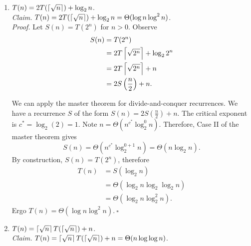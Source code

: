 \begin{enumerate}
\item$T(n)=2T(\left\lceil\sqrt{n}\right\rceil)+\log_2 n$.\\

\textit{Claim. }$T(n)=2T(\left\lceil\sqrt{n}\right\rceil)+\log_2n=\Theta(\log n\log^2 n)$.\\

\textit{Proof. }Let $S(n)=T(2^n)$ for $n>0$. Observe
\begin{align*}
S(n)&=T(2^n)\\
&=2T\left\lceil\sqrt{2^n}\right\rceil+\log_2{2^n}\\
&=2T\left\lceil\sqrt{2^n}\right\rceil+n\\
&=2S\left(\frac{n}{2}\right)+n.
\end{align*}

We can apply the master theorem for divide-and-conquer recurrences. We have a recurrence $S$ of the form $S(n)=2S\left(\frac{n}{2}\right)+n$. The critical exponent is $c^*=\log_2(2)=1$. Note $n=\Theta(n^{c^*}\log_2^0n)$. Therefore, Case II of the master theorem gives
\begin{equation*}
S(n)=\Theta(n^{c^*}\log_2^{0+1}n)=\Theta(n\log_2 n).
\end{equation*}
By construction, $S(n)=T(2^n)$, therefore
\begin{align*}
T(n)&=S(\log_2n)\\
&=\Theta(\log_2n\log_2\log_2n)\\
&=\Theta(\log_2n\log_2^2n).
\end{align*}
Ergo $T(n)=\Theta(\log n\log^2n)$.$~\square$
\item $T(n)=\left\lceil\sqrt{n}\right\rceil T(\left\lceil\sqrt{n}\right\rceil)+n$.\\

\textit{Claim. }$T(n)=\left\lceil\sqrt{n}\right\rceil T(\left\lceil\sqrt{n}\right\rceil)+n=\Theta(n\log\log n)$.\\


\end{enumerate}
